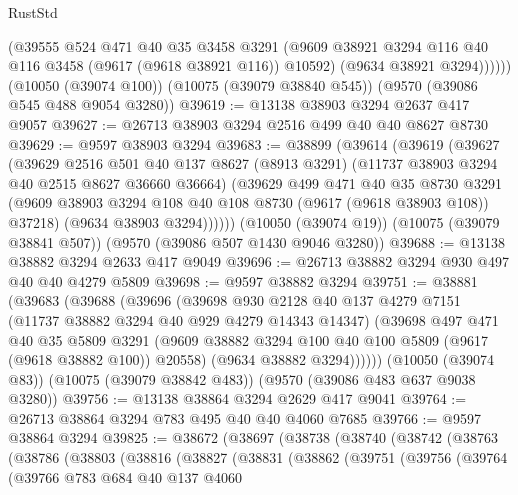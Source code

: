 \begin{lexlean}{RustStd}
\begin{coremodule}
            (@39555
              @524
              @471
              @40
              @35
              @3458
              @3291
              (@9609 @38921 @3294 @116 @40 @116 @3458 (@9617 (@9618 @38921 @116)) @10592)
              (@9634 @38921 @3294))))))
    (@10050 (@39074 @100))
    (@10075 (@39079 @38840 @545))
    (@9570 (@39086 @545 @488 @9054 @3280))
@39619 := @13138 @38903 @3294 @2637 @417 @9057
@39627 := @26713 @38903 @3294 @2516 @499 @40 @40 @8627 @8730
@39629 := @9597 @38903 @3294
@39683 := @38899
    (@39614
      (@39619
        (@39627
          (@39629
            @2516
            @501
            @40
            @137
            @8627
            (@8913 @3291)
            (@11737 @38903 @3294 @40 @2515 @8627 @36660 @36664)
            (@39629
              @499
              @471
              @40
              @35
              @8730
              @3291
              (@9609 @38903 @3294 @108 @40 @108 @8730 (@9617 (@9618 @38903 @108)) @37218)
              (@9634 @38903 @3294))))))
    (@10050 (@39074 @19))
    (@10075 (@39079 @38841 @507))
    (@9570 (@39086 @507 @1430 @9046 @3280))
@39688 := @13138 @38882 @3294 @2633 @417 @9049
@39696 := @26713 @38882 @3294 @930 @497 @40 @40 @4279 @5809
@39698 := @9597 @38882 @3294
@39751 := @38881
    (@39683
      (@39688
        (@39696
          (@39698
            @930
            @2128
            @40
            @137
            @4279
            @7151
            (@11737 @38882 @3294 @40 @929 @4279 @14343 @14347)
            (@39698
              @497
              @471
              @40
              @35
              @5809
              @3291
              (@9609 @38882 @3294 @100 @40 @100 @5809 (@9617 (@9618 @38882 @100)) @20558)
              (@9634 @38882 @3294))))))
    (@10050 (@39074 @83))
    (@10075 (@39079 @38842 @483))
    (@9570 (@39086 @483 @637 @9038 @3280))
@39756 := @13138 @38864 @3294 @2629 @417 @9041
@39764 := @26713 @38864 @3294 @783 @495 @40 @40 @4060 @7685
@39766 := @9597 @38864 @3294
@39825 := @38672
    (@38697
      (@38738
        (@38740
          (@38742
            (@38763
              (@38786
                (@38803
                  (@38816
                    (@38827
                      (@38831
                        (@38862
                          (@39751
                            (@39756
                              (@39764
                                (@39766
                                  @783
                                  @684
                                  @40
                                  @137
                                  @4060

\end{coremodule}
\end{lexlean}

